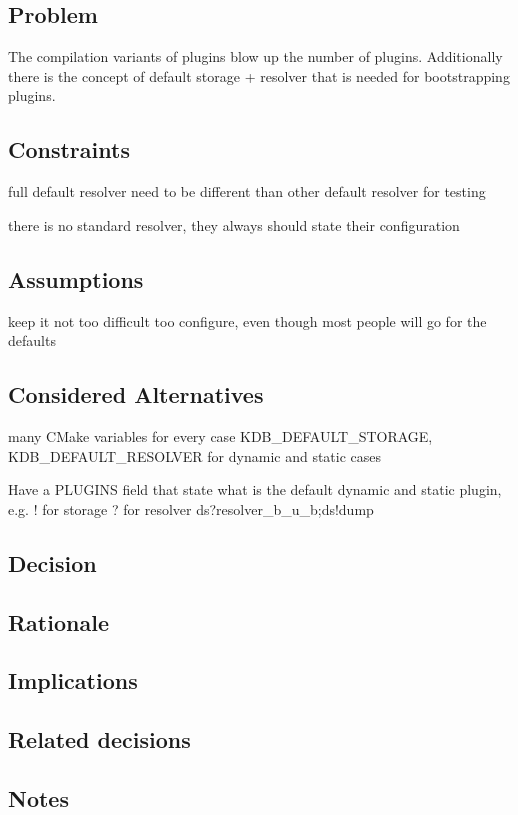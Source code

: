 \subsection*{Problem}

The compilation variants of plugins blow up the number of plugins. Additionally there is the concept of default storage + resolver that is needed for bootstrapping plugins.

\subsection*{Constraints}


\begin{DoxyItemize}
\item full default resolver need to be different than other default resolver for testing
\item there is no standard resolver, they always should state their configuration
\end{DoxyItemize}

\subsection*{Assumptions}


\begin{DoxyItemize}
\item keep it not too difficult too configure, even though most people will go for the defaults
\end{DoxyItemize}

\subsection*{Considered Alternatives}


\begin{DoxyItemize}
\item many C\+Make variables for every case K\+D\+B\+\_\+\+D\+E\+F\+A\+U\+L\+T\+\_\+\+S\+T\+O\+R\+A\+GE, K\+D\+B\+\_\+\+D\+E\+F\+A\+U\+L\+T\+\_\+\+R\+E\+S\+O\+L\+V\+ER for dynamic and static cases
\item Have a P\+L\+U\+G\+I\+NS field that state what is the default dynamic and static plugin, e.\+g. ! for storage ? for resolver ds?resolver\+\_\+b\+\_\+u\+\_\+b;ds!dump
\end{DoxyItemize}

\subsection*{Decision}

\subsection*{Rationale}

\subsection*{Implications}

\subsection*{Related decisions}

\subsection*{Notes}